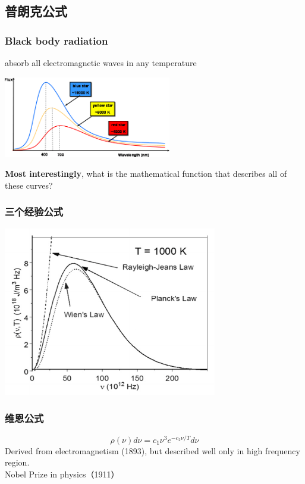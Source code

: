 \subsection{普朗克公式}

\begin{frame}
    \frametitle{Black body radiation}
    \begin{definition}
    \hspace{2em}absorb all electromagnetic waves in any temperature
    \end{definition}
    \begin{center}
        \includegraphics[width=0.55\textwidth]{figs/blackbody_radn_curves.png}
    \end{center}
    \textbf{\color{deepred} Most interestingly}, what is the mathematical function that describes all of these curves?
\end{frame}

\begin{frame}
    \frametitle{三个经验公式}
    \begin{center}
        \includegraphics[width=0.7\textwidth]{figs/threelaws.png}
    \end{center}
\end{frame}

\begin{frame} [t]
    \frametitle{维恩公式}
    \begin{equation*}
        \rho(\nu) d \nu=c_{1} \nu^{3} e^{-c_{2} \nu / T} d \nu 
    \end{equation*}
    Derived from electromagnetism (1893), but described well only in high frequency region.\\ 
    {\color{deepred} Nobel Prize in physics（1911）}\\
\end{frame}

